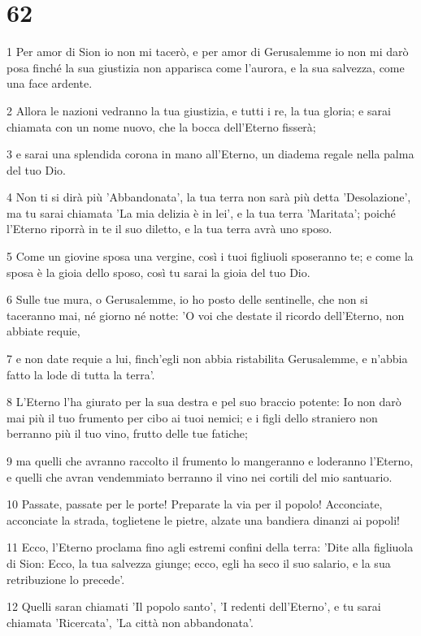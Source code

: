 \chapter{62}

\par 1 Per amor di Sion io non mi tacerò, e per amor di Gerusalemme io non mi darò posa finché la sua giustizia non apparisca come l'aurora, e la sua salvezza, come una face ardente.
\par 2 Allora le nazioni vedranno la tua giustizia, e tutti i re, la tua gloria; e sarai chiamata con un nome nuovo, che la bocca dell'Eterno fisserà;
\par 3 e sarai una splendida corona in mano all'Eterno, un diadema regale nella palma del tuo Dio.
\par 4 Non ti si dirà più 'Abbandonata', la tua terra non sarà più detta 'Desolazione', ma tu sarai chiamata 'La mia delizia è in lei', e la tua terra 'Maritata'; poiché l'Eterno riporrà in te il suo diletto, e la tua terra avrà uno sposo.
\par 5 Come un giovine sposa una vergine, così i tuoi figliuoli sposeranno te; e come la sposa è la gioia dello sposo, così tu sarai la gioia del tuo Dio.
\par 6 Sulle tue mura, o Gerusalemme, io ho posto delle sentinelle, che non si taceranno mai, né giorno né notte: 'O voi che destate il ricordo dell'Eterno, non abbiate requie,
\par 7 e non date requie a lui, finch'egli non abbia ristabilita Gerusalemme, e n'abbia fatto la lode di tutta la terra'.
\par 8 L'Eterno l'ha giurato per la sua destra e pel suo braccio potente: Io non darò mai più il tuo frumento per cibo ai tuoi nemici; e i figli dello straniero non berranno più il tuo vino, frutto delle tue fatiche;
\par 9 ma quelli che avranno raccolto il frumento lo mangeranno e loderanno l'Eterno, e quelli che avran vendemmiato berranno il vino nei cortili del mio santuario.
\par 10 Passate, passate per le porte! Preparate la via per il popolo! Acconciate, acconciate la strada, toglietene le pietre, alzate una bandiera dinanzi ai popoli!
\par 11 Ecco, l'Eterno proclama fino agli estremi confini della terra: 'Dite alla figliuola di Sion: Ecco, la tua salvezza giunge; ecco, egli ha seco il suo salario, e la sua retribuzione lo precede'.
\par 12 Quelli saran chiamati 'Il popolo santo', 'I redenti dell'Eterno', e tu sarai chiamata 'Ricercata', 'La città non abbandonata'.

